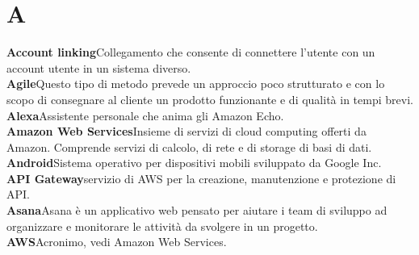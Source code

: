 \newpage
\section{A}\label{l:A}
\textbf{Account linking}\newline Collegamento che consente di connettere l'utente con un account utente in un sistema diverso.\\
\newline
\textbf{Agile}\newline Questo tipo di metodo prevede un approccio poco strutturato e con lo scopo di consegnare al cliente un prodotto funzionante e di qualità in tempi brevi.\\
\newline
\textbf{Alexa}\newline Assistente personale che anima gli Amazon Echo.\\
\newline
\textbf{Amazon Web Services}\newline Insieme di servizi di cloud computing offerti da Amazon. Comprende servizi di calcolo, di rete e di storage di basi di dati.\\
\newline
\textbf{Android}\newline Sistema operativo per dispositivi mobili sviluppato da Google Inc.\\
\newline
\textbf{API Gateway}\newline servizio di AWS per la creazione, manutenzione e protezione di API.\\
\newline
\textbf{Asana}\newline Asana è un applicativo web pensato per aiutare i team di sviluppo ad organizzare e monitorare le attività da svolgere in un progetto.\\
\newline
\textbf{AWS}\newline Acronimo, vedi Amazon Web Services.

